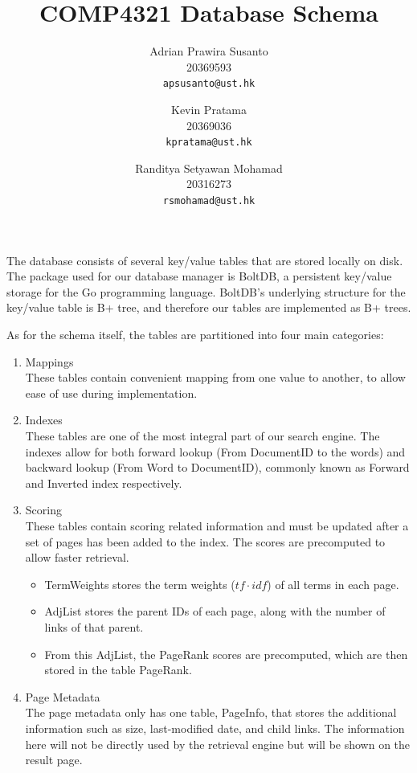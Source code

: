 \documentclass[11pt,a4paper]{article}
\title{COMP4321 Database Schema}
\author{
    Adrian Prawira Susanto\\20369593\\ \texttt{apsusanto@ust.hk} \and
    Kevin Pratama\\20369036\\ \texttt{kpratama@ust.hk} \and
    Randitya Setyawan Mohamad\\20316273\\ \texttt{rsmohamad@ust.hk}}
\date{}
\begin{document}
    \maketitle

    The database consists of several key/value tables that are stored locally on disk.
    The package used for our database manager is BoltDB, a persistent key/value storage for the Go programming language.
    BoltDB's underlying structure for the key/value table is B+ tree, and therefore our tables are implemented as B+ trees.

    As for the schema itself, the tables are partitioned into four main categories:
    \begin{enumerate}
        \item Mappings \\
        These tables contain convenient mapping from one value to another, to allow ease of use during implementation.
        \item Indexes \\
        These tables are one of the most integral part of our search engine.
        The indexes allow for both forward lookup (From DocumentID to the words) and backward lookup (From Word to DocumentID), commonly known as Forward and Inverted index respectively.
        \item Scoring \\
        These tables contain scoring related information and must be updated after a set of pages has been added to the index.
        The scores are precomputed to allow faster retrieval.
        \begin{itemize}
            \item TermWeights stores the term weights ($tf \cdot idf$) of all terms in each page.
            \item AdjList stores the parent IDs of each page, along with the number of links of that parent.
            \item From this AdjList, the PageRank scores are precomputed, which are then stored in the table PageRank.
        \end{itemize}
        \item Page Metadata \\
        The page metadata only has one table, PageInfo, that stores the additional information such as size, last-modified date, and child links.
        The information here will not be directly used by the retrieval engine but will be shown on the result page.

    \end{enumerate}
\end{document}
